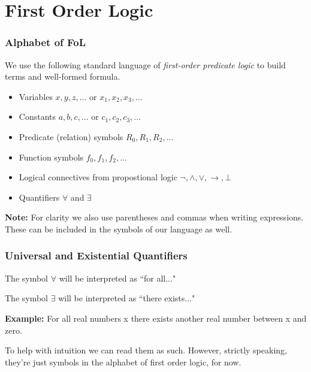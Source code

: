 \documentclass{beamer}
\theoremstyle{indentDefn} \newtheorem{defn}[]{Definition}
\begin{document}
	

\section{First Order Logic}

\begin{frame}
	\frametitle{Alphabet of FoL}
	
	We use the following standard language of \emph{first-order predicate logic} to build terms and well-formed formula.
	
	\vspace{0.5cm}
	
	\begin{itemize}
		\item Variables $x,y,z,...$ or $x_{1}, x_{2}, x_{3},...$
		\item Constants $a,b,c, ...$ or $c_{1}, c_{2}, c_{3}, ...$
		\item Predicate (relation) symbols $R_{0}, R_{1}, R_{2}, ... $
		\item Function symbols $f_{0}, f_{1}, f_{2}, ... $
		\item Logical connectives from propostional logic $\lnot, \land, \lor, \rightarrow, \bot$
		\item Quantifiers $\forall$ and $\exists$
	\end{itemize}

	\vspace{0.5cm}
	
	{\bf Note:} For clarity we also use parentheses and commas when writing expressions. These can be included in the symbols of our language as well.
	
	
\end{frame}

\begin{frame}
	\frametitle{Universal and Existential Quantifiers}
	
	The symbol $\forall$ will be interpreted as ``for all..."
	
	The symbol $\exists$ will be interpreted as ``there exists..."
	

	
	\vspace{0.5cm}
	
	{\bf Example:}
	For all real numbers x there exists another real number between x and zero.
	
	\vspace{2cm}
	
	To help with intuition we can read them as such. However, strictly speaking, they're just symbols in the alphabet of first order logic, for now.
	
	
\end{frame}
\end{document}
